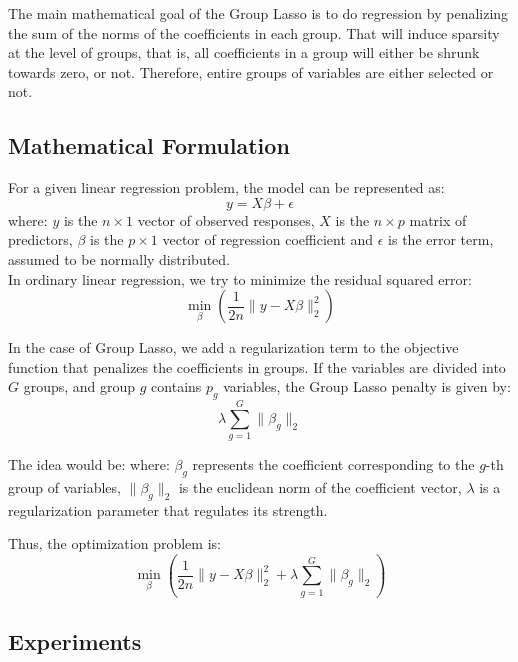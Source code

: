 \documentclass[a4paper, 9pt]{article}
\begin{document}
\begin{multicols}{2}
The main mathematical goal of the Group Lasso is to do regression by penalizing the sum of the norms of the coefficients in each group. That will induce sparsity at the level of groups, that is, all coefficients in a group will either be shrunk towards zero, or not. Therefore, entire groups of variables are either selected or not.

\subsection{Mathematical Formulation} \vspace{-3pt}
For a given linear regression problem, the model can be represented as:
\begin{equation}
y=X\beta + \epsilon
\end{equation}
where: $y$ is the $n \times 1$ vector of observed responses, $X$ is the $n \times p$ matrix of predictors, $\beta$ is the $p \times 1$ vector of regression coefficient and $\epsilon$ is the error term, assumed to be normally distributed.\\

In ordinary linear regression, we try to minimize the residual squared error: \begin{equation} \min_{\beta}\left (\frac{1}{2n}\lVert y-X\beta\rVert^{2}_{2} \right) 
\end{equation}

In the case of Group Lasso, we add a regularization term to the objective function that penalizes the coefficients in groups. If the variables are divided into $G$ groups, and group $g$ contains $p_{g}$ variables, the Group Lasso penalty is given by: \begin{equation} \lambda \sum_{g=1}^{G}\lVert \beta_{g} \rVert_{2}
\end{equation}

The idea would be: where: $\beta_g$ represents the coefficient corresponding to the $g$-th group of variables, $\lVert \beta_g \rVert_2$ is the euclidean norm of the coefficient vector, $\lambda$ is a regularization parameter that regulates its strength.

Thus, the optimization problem is: \begin{equation}
\min_{\beta}\left (\frac{1}{2n}\lVert y-X\beta\rVert^{2}_{2} + \lambda \sum_{g=1}^{G}\lVert \beta_{g} \rVert_{2}\right)
\end{equation}

\subsection{Experiments} \vspace{-3pt}



\end{multicols}
\end{document}
